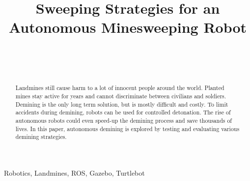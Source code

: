 \documentclass[conference]{IEEEtran}
\begin{document}
\title{Sweeping Strategies for an Autonomous Minesweeping Robot\\}

\author{
\\

\and

\\

}

\maketitle

\begin{abstract}
Landmines still cause harm to a lot of innocent people around the world. Planted mines stay active for years and cannot discriminate between civilians and soldiers. Demining is the only long term solution, but is mostly difficult and costly. To limit accidents during demining, robots can be used for controlled detonation. The rise of autonomous robots could even speed-up the demining process and save thousands of lives. In this paper, autonomous demining is explored by testing and evaluating various demining strategies.
\end{abstract}


\begin{IEEEkeywords}
Robotics, Landmines, ROS, Gazebo, Turtlebot
\end{IEEEkeywords}
\end{document}
